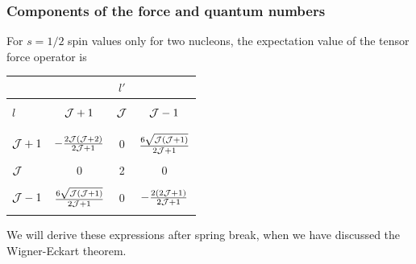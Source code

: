\documentclass[compress]{beamer}
\begin{document}
\frame
{
\frametitle{Components of the force and quantum numbers}
 For $s=1/2$ spin values only for two nucleons, the expectation value of the tensor force operator is 
\begin{center}
\begin{tabular}{lccc} 
& & $l'$  &  \\ \hline
 & & & \\ 
$l$  & ${\cal J}+1$    & ${\cal J}$  & ${\cal J}-1$  \\ & & & \\  \hline 
& & & \\ 
${\cal J}+1$ & $-\frac{2{\cal J}({\cal J}+2)}{2{\cal J}+1}$  &0  &$\frac{6\sqrt{{\cal J}({\cal J}+1)}}{2{\cal J}+1}$   \\ 
& & & \\ 
${\cal J}$&  0      &2      &    0     \\ 
& & & \\ 
${\cal J}-1$& $\frac{6\sqrt{{\cal J}({\cal J}+1)}}{2{\cal J}+1}$       & 0     & $-\frac{2(2{\cal J}+1)}{2{\cal J}+1}$        \\
& & & \\ \hline 
\end{tabular}
\end{center}
We will derive these expressions after spring break, when we have discussed the Wigner-Eckart theorem. 
} 
\end{document}
